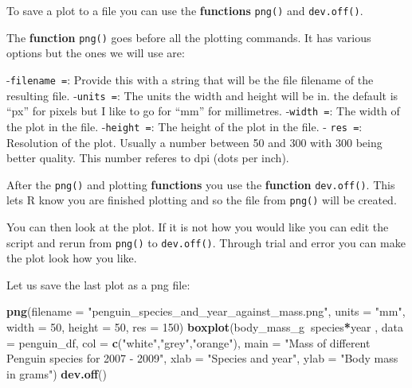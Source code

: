 \documentclass[]{book}
\newenvironment{Shaded}{\begin{snugshade}}{\end{snugshade}}
\newcommand{\KeywordTok}[1]{\textcolor[rgb]{0.13,0.29,0.53}{\textbf{#1}}}
\newcommand{\DataTypeTok}[1]{\textcolor[rgb]{0.13,0.29,0.53}{#1}}
\newcommand{\DecValTok}[1]{\textcolor[rgb]{0.00,0.00,0.81}{#1}}
\newcommand{\StringTok}[1]{\textcolor[rgb]{0.31,0.60,0.02}{#1}}
\newcommand{\OperatorTok}[1]{\textcolor[rgb]{0.81,0.36,0.00}{\textbf{#1}}}
\newcommand{\NormalTok}[1]{#1}
\begin{document}
To save a plot to a file you can use the \textbf{functions}
\texttt{png()} and \texttt{dev.off()}.

The \textbf{function} \texttt{png()} goes before all the plotting
commands. It has various options but the ones we will use are:

-\texttt{filename\ =}: Provide this with a string that will be the file
filename of the resulting file. -\texttt{units\ =}: The units the width
and height will be in. the default is ``px'' for pixels but I like to go
for ``mm'' for millimetres. -\texttt{width\ =}: The width of the plot in
the file. -\texttt{height\ =}: The height of the plot in the file. -
\texttt{res\ =}: Resolution of the plot. Usually a number between 50 and
300 with 300 being better quality. This number referes to dpi (dots per
inch).

After the \texttt{png()} and plotting \textbf{functions} you use the
\textbf{function} \texttt{dev.off()}. This lets R know you are finished
plotting and so the file from \texttt{png()} will be created.

You can then look at the plot. If it is not how you would like you can
edit the script and rerun from \texttt{png()} to \texttt{dev.off()}.
Through trial and error you can make the plot look how you like.

Let us save the last plot as a png file:

\begin{Shaded}
\begin{Highlighting}[]
\KeywordTok{png}\NormalTok{(}\DataTypeTok{filename =} \StringTok{"penguin_species_and_year_against_mass.png"}\NormalTok{,}
    \DataTypeTok{units =} \StringTok{"mm"}\NormalTok{, }\DataTypeTok{width =} \DecValTok{50}\NormalTok{, }\DataTypeTok{height =} \DecValTok{50}\NormalTok{, }\DataTypeTok{res =} \DecValTok{150}\NormalTok{)}
\KeywordTok{boxplot}\NormalTok{(body_mass_g}\OperatorTok{~}\NormalTok{species}\OperatorTok{*}\NormalTok{year , }
        \DataTypeTok{data =}\NormalTok{ penguin_df, }
        \DataTypeTok{col =} \KeywordTok{c}\NormalTok{(}\StringTok{"white"}\NormalTok{,}\StringTok{"grey"}\NormalTok{,}\StringTok{"orange"}\NormalTok{),}
        \DataTypeTok{main =} \StringTok{"Mass of different Penguin species for 2007 - 2009"}\NormalTok{,}
        \DataTypeTok{xlab =} \StringTok{"Species and year"}\NormalTok{,}
        \DataTypeTok{ylab =} \StringTok{"Body mass in grams"}\NormalTok{)}
\KeywordTok{dev.off}\NormalTok{()}
\end{Highlighting}
\end{Shaded}
\end{document}
